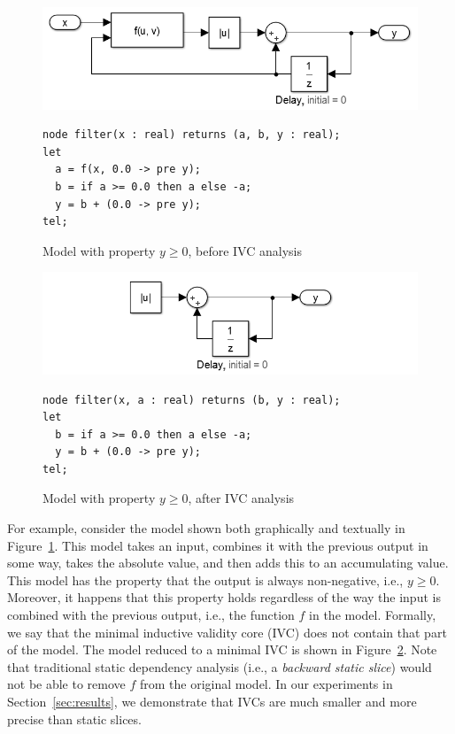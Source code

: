 \begin{figure}
\centering
\includegraphics[width=\columnwidth]{figs/simulink.png}
{\smaller
\begin{verbatim}
node filter(x : real) returns (a, b, y : real);
let
  a = f(x, 0.0 -> pre y);
  b = if a >= 0.0 then a else -a;
  y = b + (0.0 -> pre y);
tel;
\end{verbatim}
}
\vspace{-0.1in}
\caption{Model with property $y \geq 0$, before IVC analysis}
\label{fig:ex-before}
\end{figure}


\begin{figure}[t]
\includegraphics[width=\columnwidth]{figs/simulink-ivc.png}
{\smaller
\begin{verbatim}
node filter(x, a : real) returns (b, y : real);
let
  b = if a >= 0.0 then a else -a;
  y = b + (0.0 -> pre y);
tel;
\end{verbatim}
}
\vspace{-0.1in}
\caption{Model with property $y \geq 0$, after IVC analysis}
\label{fig:ex-after}
\end{figure}

For example, consider the model shown both graphically and textually in
Figure~\ref{fig:ex-before}. This model takes an input, combines it
with the previous output in some way, takes the absolute value, and
then adds this to an accumulating value. This model has the property
that the output is always non-negative, i.e., $y \geq 0$. Moreover, it
happens that this property holds regardless of the way the input is
combined with the previous output, i.e., the function $f$ in the
model. Formally, we say that the minimal inductive validity core (IVC) does
not contain that part of the model. The model reduced to a minimal IVC
is shown in Figure~\ref{fig:ex-after}. Note that traditional static
dependency analysis (i.e., a {\em backward static slice}) would not be able to
remove $f$ from the original model.  In our experiments in Section~\ref{sec:results},
we demonstrate that IVCs are much smaller and more precise than static slices.

